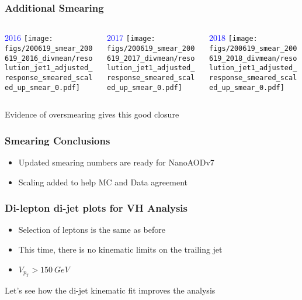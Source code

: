 \documentclass{beamer}
\begin{document}
\begin{frame}
  \frametitle{Additional Smearing}

  \begin{columns}
    \begin{column}{0.33\linewidth}
      \centering
      \textcolor{blue}{2016}
      \texttt{[image: figs/200619\_smear\_200619\_2016\_divmean/resolution\_jet1\_adjusted\_response\_smeared\_scaled\_up\_smear\_0.pdf]}
    \end{column}
    \begin{column}{0.34\linewidth}
      \centering
      \textcolor{blue}{2017}
      \texttt{[image: figs/200619\_smear\_200619\_2017\_divmean/resolution\_jet1\_adjusted\_response\_smeared\_scaled\_up\_smear\_0.pdf]}
    \end{column}
    \begin{column}{0.33\linewidth}
      \centering
      \textcolor{blue}{2018}
      \texttt{[image: figs/200619\_smear\_200619\_2018\_divmean/resolution\_jet1\_adjusted\_response\_smeared\_scaled\_up\_smear\_0.pdf]}
    \end{column}
  \end{columns}

  \vfill
  Evidence of oversmearing gives this good closure

\end{frame}


\begin{frame}
  \frametitle{Smearing Conclusions}

  \begin{itemize}
  \item Updated smearing numbers are ready for NanoAODv7
  \item Scaling added to help MC and Data agreement
  \end{itemize}

\end{frame}


\begin{frame}
  \frametitle{Di-lepton di-jet plots for VH Analysis}

  \begin{itemize}
  \item Selection of leptons is the same as before
  \item This time, there is no kinematic limits on the trailing jet
  \item $V_{p_T} > \SI{150}{GeV}$
  \end{itemize}

  \vfill
  Let's see how the di-jet kinematic fit improves the analysis

\end{frame}
\end{document}
